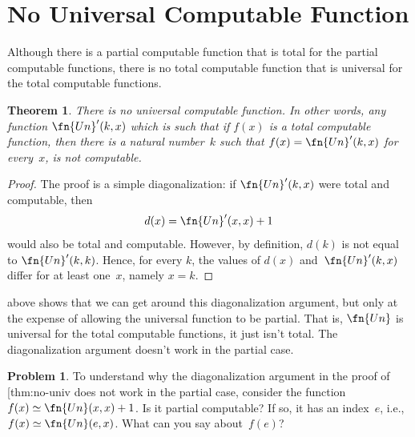 \documentclass[10pt,a4paper]{article}
\makeatletter
\theoremstyle{plain}
\newtheorem{thm}{Theorem}[section]
\theoremstyle{definition}
\newtheorem{prob}{Problem}[section]
\theoremstyle{remark}
\newenvironment{explain}{}{}
\newcommand*{\olfileid}[3]{}
\newcommand*{\olsection}[1]{\section*{#1}}
\newcommand*{\ollabel}[1]{\label{#1}}
\newcommand{\olref}{\@ifnextchar[{\olref@i}{\olref@final}}
\def\olref@i[#1]{\@ifnextchar[{\olref@ii}{\olref@final}}
\def\olref@ii[#1]{\@ifnextchar[{\olref@iii}{\olref@final}}
\def\olref@iii[#1]{\olref@final}
\def\olref@final#1{\ref{#1}}
\makeatother
\begin{document}



\olfileid{cmp}{thy}{nou}
\olsection{No Universal Computable Function}

Although there is a partial computable function that is total for the
partial computable functions, there is no total computable
function that is universal for the total computable functions. 

\begin{thm}
\ollabel{thm:no-univ}
There is no universal computable function. In other words, any
function $\fn{Un}'(k, x)$ which is such that if $f(x)$ is a total
computable function, then there is a natural number~$k$ such that
$f(x) = \fn{Un}'(k,x)$ for every~$x$, is not computable.
\end{thm}

\begin{proof}
The proof is a simple diagonalization: if $\fn{Un}'(k,x)$ were total
and computable, then
\[
d(x) = \fn{Un}'(x, x) + 1
\]
would also be total and computable. However, by definition, $d(k)$ is
not equal to $\fn{Un}'(k,k)$. Hence, for every $k$, the values of
$d(x)$ and~$\fn{Un}'(k, x)$ differ for at least one~$x$, namely $x = k$.
\end{proof}

\begin{explain}
\olref[uni]{thm:univ-comp} above shows that we can get around this
diagonalization argument, but only at the expense of allowing the
universal function to be partial. That is, $\fn{Un}$ is universal for
the total computable functions, it just isn't total. The
diagonalization argument doesn't work in the partial case. 
\end{explain}

\begin{prob}
  To understand why the diagonalization argument in the proof of
  \olref{thm:no-univ} does not work in the partial
  case, consider the function $f(x) \simeq \fn{Un}(x,x)+1$. Is it
  partial computable? If so, it has an index~$e$, i.e., $f(x) \simeq
  \fn{Un}(e,x)$. What can you say about~$f(e)$?
\end{prob}



\end{document}
